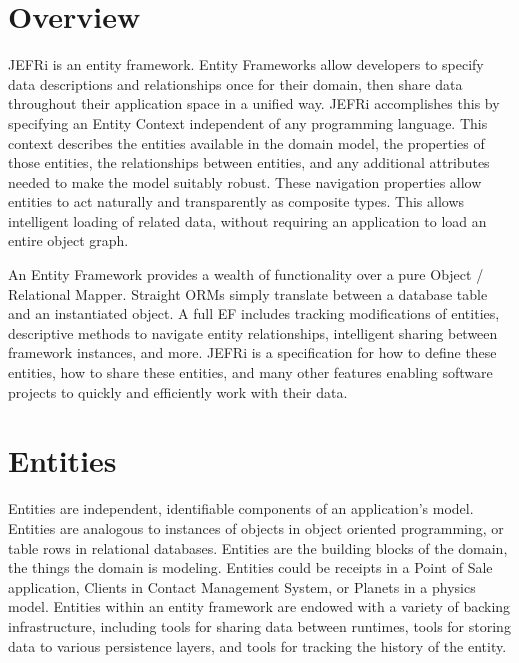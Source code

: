 \documentclass{article}
\begin{document}

\tableofcontents
\newpage
\linespread{1.6}

\section{Overview}

JEFRi is an entity framework. Entity Frameworks allow developers to specify data
descriptions and relationships once for their domain, then share data throughout
their application space in a unified way. JEFRi accomplishes this by specifying
an Entity Context independent of any programming language. This context
describes the entities available in the domain model, the properties of those
entities, the relationships between entities, and any additional attributes
needed to make the model suitably robust. These navigation properties allow
entities to act naturally and transparently as composite types. This allows
intelligent loading of related data, without requiring an application to load an
entire object graph.

An Entity Framework provides a wealth of functionality over a pure Object /
Relational Mapper. Straight ORMs simply translate between a database table and
an instantiated object. A full EF includes tracking modifications of entities,
descriptive methods to navigate entity relationships, intelligent sharing
between framework instances, and more. JEFRi is a specification for how to
define these entities, how to share these entities, and many other features
enabling software projects to quickly and efficiently work with their data.

\section{Entities}

Entities are independent, identifiable components of an application's model.
Entities are analogous to instances of objects in object oriented programming,
or table rows in relational databases. Entities are the building blocks of the
domain, the things the domain is modeling. Entities could be receipts in a Point
of Sale application, Clients in Contact Management System, or Planets in a
physics model. Entities within an entity framework are endowed with a variety of
backing infrastructure, including tools for sharing data between runtimes, tools
for storing data to various persistence layers, and tools for tracking the
history of the entity.
\end{document}
